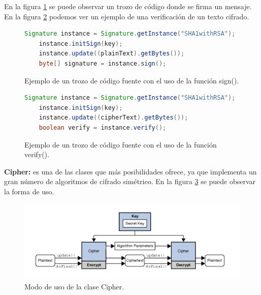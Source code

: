 En la figura \ref{cod:signature} se puede observar un trozo de código donde se firma un mensaje. En la figura \ref{cod:verify} podemos ver un ejemplo de una verificación de un texto cifrado.

\begin{figure}

	\begin{scriptsize}
	\begin{lstlisting}[language=Java] 
	Signature instance = Signature.getInstance("SHA1withRSA");
	instance.initSign(key);
	instance.update((plainText).getBytes());
	byte[] signature = instance.sign();
	\end{lstlisting}
	\end{scriptsize}
		\caption{Ejemplo de un trozo de código fuente con el uso de la función sign().}
		\label{cod:signature}
\end{figure}

\begin{figure}

	\begin{scriptsize}
	\begin{lstlisting}[language=Java] 
	Signature instance = Signature.getInstance("SHA1withRSA");
	instance.initSign(key);
	instance.update((cipherText).getBytes());
	boolean verify = instance.verify();
	\end{lstlisting}
	\end{scriptsize}
		\caption{Ejemplo de un trozo de código fuente con el uso de la función verify().}
		\label{cod:verify}
\end{figure}

\textbf{Cipher:} es una de las clases que más posibilidades ofrece, ya que implementa un gran número de algoritmos de cifrado simétrico. En la figura \ref{fig:cipher} se puede observar la forma de uso. 

\begin{figure}
  \centering
    \includegraphics[scale=0.9]{./Criptografia/imagenes/cipher.png}
  \caption{Modo de uso de la clase Cipher.}
  \label{fig:cipher}
\end{figure} 

